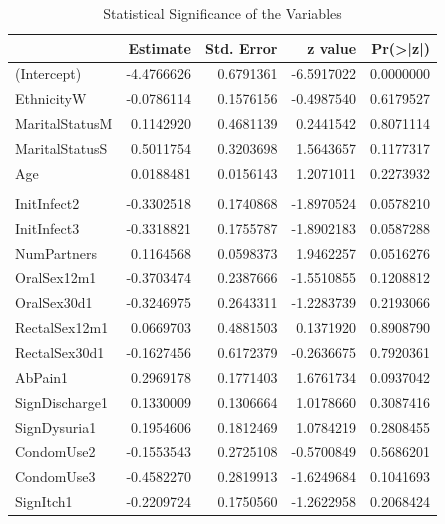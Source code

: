 \documentclass[
]{article}
\begin{document}
\begin{table}

\caption{\label{tab:variable-select}Statistical Significance of the Variables}
\centering
\begin{tabular}[t]{l|r|r|r|r}
\hline
  & Estimate & Std. Error & z value & Pr(>|z|)\\
\hline
(Intercept) & -4.4766626 & 0.6791361 & -6.5917022 & 0.0000000\\
\hline
EthnicityW & -0.0786114 & 0.1576156 & -0.4987540 & 0.6179527\\
\hline
MaritalStatusM & 0.1142920 & 0.4681139 & 0.2441542 & 0.8071114\\
\hline
MaritalStatusS & 0.5011754 & 0.3203698 & 1.5643657 & 0.1177317\\
\hline
Age & 0.0188481 & 0.0156143 & 1.2071011 & 0.2273932\\
\hline
\cellcolor{blue}{\textcolor{white}{YearsSchool}} & \cellcolor{blue}{\textcolor{white}{-0.1689015}} & \cellcolor{blue}{\textcolor{white}{0.0442657}} & \cellcolor{blue}{\textcolor{white}{-3.8156308}} & \cellcolor{blue}{\textcolor{white}{0.0001358}}\\
\hline
InitInfect2 & -0.3302518 & 0.1740868 & -1.8970524 & 0.0578210\\
\hline
InitInfect3 & -0.3318821 & 0.1755787 & -1.8902183 & 0.0587288\\
\hline
NumPartners & 0.1164568 & 0.0598373 & 1.9462257 & 0.0516276\\
\hline
OralSex12m1 & -0.3703474 & 0.2387666 & -1.5510855 & 0.1208812\\
\hline
OralSex30d1 & -0.3246975 & 0.2643311 & -1.2283739 & 0.2193066\\
\hline
RectalSex12m1 & 0.0669703 & 0.4881503 & 0.1371920 & 0.8908790\\
\hline
RectalSex30d1 & -0.1627456 & 0.6172379 & -0.2636675 & 0.7920361\\
\hline
AbPain1 & 0.2969178 & 0.1771403 & 1.6761734 & 0.0937042\\
\hline
SignDischarge1 & 0.1330009 & 0.1306664 & 1.0178660 & 0.3087416\\
\hline
SignDysuria1 & 0.1954606 & 0.1812469 & 1.0784219 & 0.2808455\\
\hline
CondomUse2 & -0.1553543 & 0.2725108 & -0.5700849 & 0.5686201\\
\hline
CondomUse3 & -0.4582270 & 0.2819913 & -1.6249684 & 0.1041693\\
\hline
SignItch1 & -0.2209724 & 0.1750560 & -1.2622958 & 0.2068424\\

\end{tabular}
\end{table}
\end{document}

